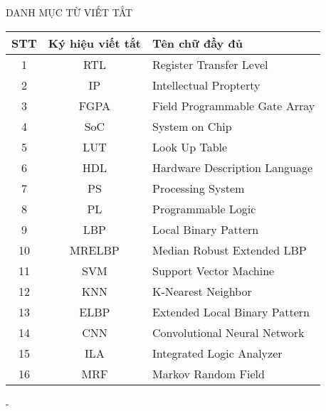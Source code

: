 \documentclass[a4paper,12pt,oneside]{book}%
\renewcommand{\baselinestretch}{1.4}
\begin{document}
\fontsize{13}{15.5}\selectfont


\newpage
\pagestyle{empty}

\newpage
\pagestyle{plain}

\newpage
\def\baselinestretch{1.3}
\pagestyle{plain}

\newpage
 
\newpage

\newpage
{}


\setlength{\parindent}{1cm}
\setlength{\parskip}{0.6ex}

\fontsize{13}{16}\selectfont
\renewcommand{\contentsname}{\vspace{-70pt}\centerline{\fontsize{14}{16}\selectfont\MakeUppercase{Mục lục}}}
\clearpage
{}
{}
\tableofcontents
\clearpage
{}
{}
\renewcommand{\chaptername}{}
\begin{center}
	\vspace*{-40pt}
	{\fontsize{14}{16}\selectfont\MakeUppercase{Danh mục từ viết tắt}}
\end{center}
\vspace{10pt}
\begin{center}
	\begin{tabular}{|c|c|l|}
		\hline
		\textbf{STT} & \textbf{Ký hiệu viết tắt} & \textbf{Tên chữ đầy đủ} \\
		\hline
		1 & RTL & Register Transfer Level \\
		2 & IP & Intellectual Propterty \\
		3 & FGPA & Field Programmable Gate Array \\
		4 & SoC & System on Chip \\
		5 & LUT & Look Up Table \\
		6 & HDL & Hardware Description Language \\
		7 & PS & Processing System \\
		8 & PL & Programmable Logic \\
		9 & LBP & Local Binary Pattern \\
		10 & MRELBP & Median Robust Extended LBP \\
		11 & SVM & Support Vector Machine \\
		12 & KNN & K-Nearest Neighbor \\
		13 & ELBP & Extended Local Binary Pattern \\ 
		14 & CNN & Convolutional Neural Network \\ 
		15 & ILA & Integrated Logic Analyzer
	\\	16 & MRF & Markov Random Field
	\\
		\hline
	\end{tabular}
\end{center}
\vspace{20pt}
\fontsize{13}{16}\selectfont
-
\end{document}
